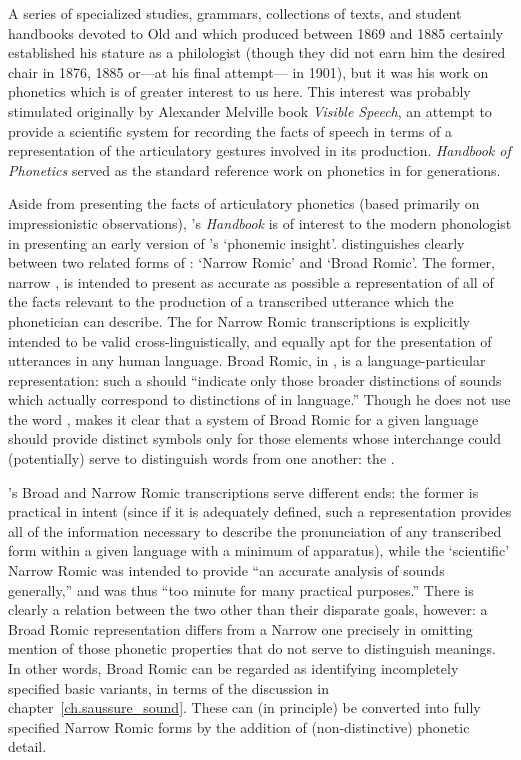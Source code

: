 A series of specialized studies, grammars, collections of texts, and
student handbooks devoted to Old and  which {\Sweet}
produced between 1869 and 1885 certainly established his stature as a
philologist (though they did not earn him the desired chair in 1876,
1885 or—at his final attempt— in 1901), but it was his work on
phonetics which is of greater interest to us here. This interest was
probably stimulated originally by Alexander Melville
 book \textsl{Visible Speech}, an
attempt to provide a scientific system for recording the facts of
speech in terms of a representation of the articulatory gestures
involved in its production. 
\textsl{Handbook of Phonetics} served as the standard reference work
on phonetics in  for generations.

Aside from presenting the facts of articulatory phonetics (based
primarily on impressionistic observations), {\Sweet}'s \textsl{Handbook}
is of interest to the modern phonologist in presenting an early
version of {\Saussure}'s `phonemic insight'. {\Sweet} distinguishes clearly
between two related forms of : `Narrow Romic'
and `Broad Romic'. The former, narrow , is intended to
present as accurate as possible a representation of all of the facts
relevant to the production of a transcribed utterance which the
phonetician can describe. The  for Narrow Romic
transcriptions is explicitly intended to be valid
cross-linguistically, and equally apt for the presentation of
utterances in any human language. Broad Romic, in , is a
language-particular representation: such a  should
``indicate only those broader distinctions of sounds which actually
correspond to distinctions of  in language.'' Though he does not
use the word , {\Sweet} makes it clear that a system of Broad
Romic  for a given language should provide distinct
symbols only for those elements whose interchange could (potentially)
serve to distinguish words from one another: the .

{\Sweet}'s Broad and Narrow Romic transcriptions serve different ends:
the former is practical in intent (since if it is adequately defined,
such a representation provides all of the information necessary to
describe the pronunciation of any transcribed form within a given
language with a minimum of apparatus), while the `scientific' Narrow
Romic was intended to provide ``an accurate analysis of sounds
generally,'' and was thus ``too minute for many practical purposes.''
There is clearly a relation between the two other than their disparate
goals, however: a Broad Romic representation differs from a Narrow one
precisely in omitting mention of those phonetic properties that do not
serve to distinguish meanings. In other words, Broad Romic
 can be regarded as identifying incompletely specified
basic variants, in terms of the discussion in
chapter~\ref{ch.saussure_sound}. These can (in principle) be converted
into fully specified Narrow Romic forms by the addition of
(non-distinctive) phonetic detail.


